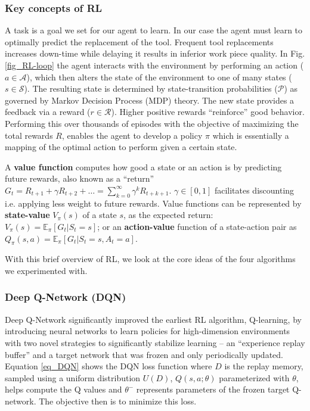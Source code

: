 \documentclass[referee, sn-mathphys-num]{sn-jnl}
\begin{document}
	\subsubsection*{Key concepts of RL}
	A task is a goal we set for our agent to learn. In our case the agent must learn to optimally predict the replacement of the tool. Frequent tool replacements increases down-time while delaying it results in inferior work piece quality. In Fig. \ref{fig_RL-loop} the agent interacts with the environment by performing an action ($a \in \mathcal{A}$), which then alters the state of the environment to one of many states ($s \in \mathcal{S}$). The resulting state is determined by state-transition probabilities ($\mathcal{P}$) as governed by Markov Decision Process (MDP) theory. The new state provides a feedback via a reward ($r \in \mathcal{R}$). Higher positive rewards ``reinforce'' good behavior. Performing this over thousands of episodes with the objective of maximizing the total rewards $R$, enables the agent to develop a policy $\pi$ which is essentially a mapping of the optimal action to perform given a certain state.
	
	A \textbf{value function} computes how good a state or an action is by predicting future rewards, also known as a ``return'' $G_t = R_{t+1} + \gamma R_{t+2} + \dots = \sum_{k=0}^{\infty} \gamma^k R_{t+k+1}$. $\gamma \in [0, 1]$ facilitates discounting i.e. applying less weight to future rewards. Value functions can be represented by \textbf{state-value} $V_{\pi}(s)$ of a state $s$, as the expected return: $V_{\pi}(s) = \mathbb{E}_{\pi}[G_t \vert S_t = s]$; or an \textbf{action-value} function of a state-action pair as $Q_{\pi}(s, a) = \mathbb{E}_{\pi}[G_t \vert S_t = s, A_t = a]$.
	
	With this brief overview of RL, we look at the core ideas of the four algorithms we experimented with.
	
	\subsubsection*{Deep Q-Network (DQN)}
	Deep Q-Network \cite{DQN-mnih2013} significantly improved the earliest RL algorithm, Q-learning, by introducing neural networks to learn policies for high-dimension environments with two novel strategies to significantly stabilize learning -- an ``experience replay buffer'' and a target network that was frozen and only periodically updated. Equation \eqref{eq_DQN} shows the DQN loss function where $D$ is the replay memory, sampled using a uniform distribution $U(D)$, $Q(s, a; \theta)$ parameterized with $\theta$, helps compute the Q values and $\theta^{-}$ represents parameters of the frozen target Q-network. The objective then is to minimize this loss.
	
\end{document}
